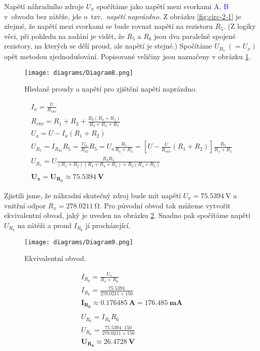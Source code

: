 Napětí náhradního zdroje $U_x$ spočítáme jako napětí mezi svorkami \textcolor{blue}{A}, \textcolor{blue}{B} v~obvodu bez zátěže, jde o~tzv.~\textit{napětí naprázdno}. Z obrázku \ref{fig:circ-2-1} je zřejmé, že napětí mezi svorkami se bude rovnat napětí na rezistoru $R_5$. (Z logiky věci, při pohledu na zadání je vidět, že $R_5$ a $R_6$ jsou dva paralelně spojené rezistory, na kterých se dělí proud, ale napětí je stejné.) Spočítáme $U_{R_5}\ (=U_x)$ opět metodou zjednodušování. Popisované veličiny jsou naznačeny v obrázku \ref{fig:circ-2-4}.
\begin{figure}[htb]
    \centering
    \texttt{[image: diagrams/Diagram8.png]}
    \caption{Hledané proudy a napětí pro zjištění napětí naprázdno.}
    \label{fig:circ-2-4}
\end{figure}
\begin{gather*}
    I_a = \frac{U}{R_{ekv}} \\
    R_{ekv} = R_1 + R_2 + \frac{R_3(R_4+R_5)}{R_3+R_4+R_5} \\
    U_a = U - I_a(R_1 + R_2) \\
    U_{R_5} = I_{R_{45}} R_5 = \frac{U_a}{R_{45}} R_5 = U_a \frac{R_5}{R_4+R_5} = \left[U - \frac{U}{R_{ekv}}(R_1+R_2)\right]\frac{R_5}{R_4+R_5} \\
    U_{R_5} = U \frac{R_3 R_5}{(R_1+R_2)(R_3+R_4+R_5)+R_3(R_4+R_5)} \\
    \\
    \mathbf{U_x = U_{R_5} \approx \SI{75.5394}{\volt}}
\end{gather*}

Zjistili jsme, že náhradní skutečný zdroj bude mít napětí $U_x=\SI{75.5394}{\volt}$ a vnitřní odpor $R_x=\SI{278.0211}{\ohm}$. Pro původní obvod tak můžeme vytvořit ekvivalentní obvod, jaký je uveden na obrázku \ref{fig:circ-2-5}. Snadno pak spočítáme napětí $U_{R_6}$ na zátěži a proud $I_{R_6}$ jí procházející.
\begin{figure}[H]
    \centering
    \texttt{[image: diagrams/Diagram9.png]}
    \caption{Ekvivalentní obvod.}
    \label{fig:circ-2-5}
\end{figure}
\begin{gather*}
    I_{R_6} = \frac{U_x}{R_x+R_6} \\
    I_{R_6} = \frac{\num{75.5394}}{\num{278.0211}+150} \\
    \mathbf{I_{R_6} \approx \SI{0.176485}{\ampere} = \SI{176.485}{\milli\ampere}} \\
    \\
    U_{R_6} = I_{R_6} R_6 \\
    U_{R_6} = \frac{\num{75.5394}\cdot 150}{\num{278.0211}+150} \\
    \mathbf{U_{R_6} \approx \SI{26.4728}{\volt}}
\end{gather*}